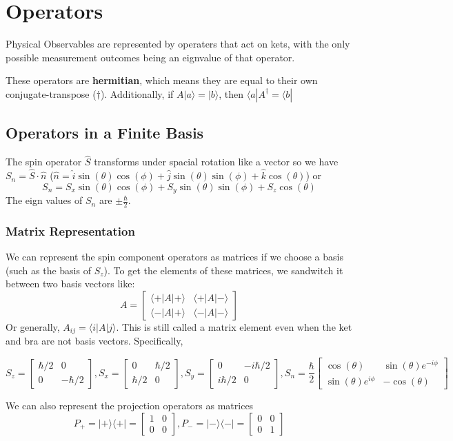 \documentclass{homework}
\newcommand{\m}[1]{\begin{bmatrix} #1 \end{bmatrix}}
\newcommand{\kt}{\rangle}
\newcommand{\br}{\langle}
\newcommand{\ket}[1]{| #1 \rangle}
\newcommand{\bra}[1]{ \langle #1 |}
\begin{document}
\section{Operators}


Physical Observables are represented by operaters that act on kets, with the only possible measurement outcomes being an eignvalue of that operator.

These operators are \textbf{hermitian}, which means they are equal to their own conjugate-transpose ($\dagger$). Additionally, if $A\ket{a} = \ket{b}$, then $\bra{a}A^{\dagger} = \bra{b}$

\subsection{Operators in a Finite Basis}


The spin operator $\hat{S}$ transforms under spacial rotation like a vector so we have $S_n = \hat{S}\cdot \hat{n}$ ($\hat{n} = \hat{i}\sin(\theta)\cos(\phi) + \hat{j}\sin(\theta)\sin(\phi) + \hat{k}\cos(\theta)$) or 
\[S_n = S_x\sin(\theta)\cos(\phi) + S_y\sin(\theta)\sin(\phi) + S_z\cos(\theta)\]
The eign values of $S_n$ are $\pm \frac{\hbar}{2}$. 

\subsubsection{Matrix Representation}

We can represent the spin component operators as matrices if we choose a basis (such as the basis of $S_z$). To get the elements of these matrices, we sandwitch it between two basis vectors like: 
\[A = \m{\br + | A | + \kt & \br + | A | - \kt \\ \br - | A | + \kt & \br - | A | - \kt}\]
Or generally, $A_{ij} = \br i | A | j \kt$. This is still called a matrix element even when the ket and bra are not basis vectors. Specifically, 

\[S_z = \m{\hbar/2 & 0 \\ 0 & -\hbar/2}, S_x = \m{  0 & \hbar/2 \\ \hbar/2 & 0}, S_y = \m{ 0 & -i\hbar/2\\ i\hbar/2 & 0 }, S_n  = \frac{\hbar}{2}\m{\cos(\theta) & \sin(\theta)e^{-i\phi} \\\sin(\theta)e^{i\phi} & -\cos(\theta)}\]

We can also represent the projection operators as matrices
\[P_{+} =\ket{+}\bra{+}  = \m{1 & 0 \\ 0 & 0 }, P_{-} =\ket{-}\bra{-}  = \m{0 & 0 \\ 0 & 1 }\]
\end{document}
